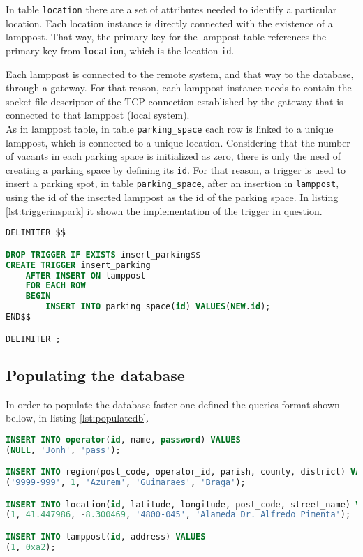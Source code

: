 In table \verb|location| there are a set of attributes needed to identify a particular location. Each location instance is directly connected with the existence of a lamppost. That way, the primary key for the lamppost table references the primary key from \verb|location|, which is the location \verb|id|.

Each lamppost is connected to the remote system, and that way to the database, through a gateway. For that reason, each lamppost instance needs to contain the socket file descriptor of the TCP connection established by the gateway that is connected to that lamppost (local system).\\

As in lamppost table, in table \verb|parking_space| each row is linked to a unique lamppost, which is connected to a unique location. Considering that the number of vacants in each parking space is initialized as zero, there is only the need of creating a parking space by defining its \verb|id|. For that reason, a trigger is used to insert a parking spot, in table \verb|parking_space|, after an insertion in \verb|lamppost|, using the id of the inserted lamppost as the id of the parking space. In listing \ref{lst:triggerinspark} it shown the implementation of the trigger in question.

\begin{lstlisting}[language=SQL, caption={Trigger to insert a parking spot after lampost insert.}, label={lst:triggerinspark}]
DELIMITER $$

DROP TRIGGER IF EXISTS insert_parking$$
CREATE TRIGGER insert_parking
	AFTER INSERT ON lamppost
	FOR EACH ROW
	BEGIN
		INSERT INTO parking_space(id) VALUES(NEW.id);
END$$

DELIMITER ;
\end{lstlisting}

\subsection{Populating the database}
In order to populate the database faster one defined the queries format shown bellow, in listing \ref{lst:populatedb}.

\begin{lstlisting}[language=SQL, caption={Queries examples to populate database.}, label={lst:populatedb}]
INSERT INTO operator(id, name, password) VALUES
(NULL, 'Jonh', 'pass');

INSERT INTO region(post_code, operator_id, parish, county, district) VALUES
('9999-999', 1, 'Azurem', 'Guimaraes', 'Braga');

INSERT INTO location(id, latitude, longitude, post_code, street_name) VALUES
(1, 41.447986, -8.300469, '4800-045', 'Alameda Dr. Alfredo Pimenta');

INSERT INTO lamppost(id, address) VALUES
(1, 0xa2);

\end{lstlisting}


